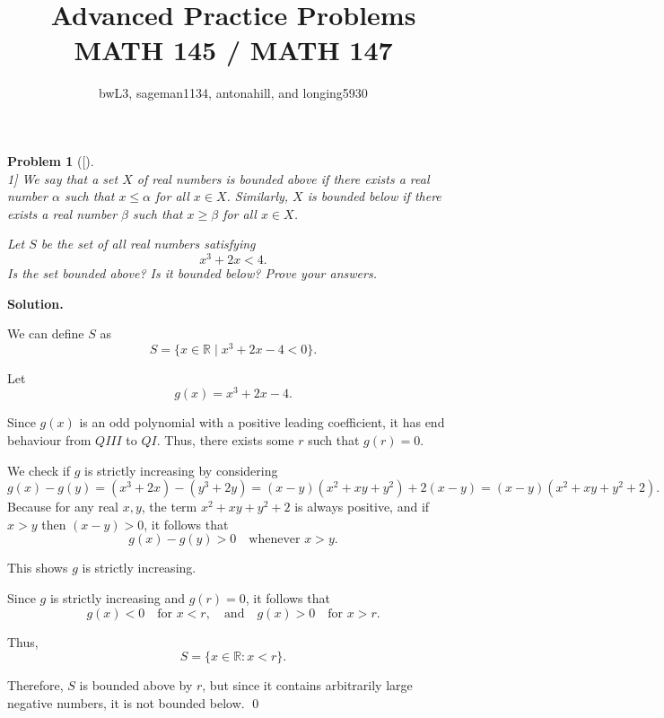 \documentclass[12pt]{article}
\title{Advanced Practice Problems \\ \large MATH 145 / MATH 147}
\author{bwL3, sageman1134, antonahill, and longing5930}
\date{}
\newtheorem{problemx}{Problem}
\newenvironment{problem}[1]{%
	\begin{problemx}[#1]\leavevmode\\[0.5em] %
	}{%
	\end{problemx}
}
\newenvironment{solution}{%
	\par\medskip
	\noindent\textbf{Solution.}\par\nopagebreak
}{%
	\hfill \qed \par\medskip
}
\begin{document}
	
	\maketitle
	
	\begin{problem}[1]
		We say that a set $X$ of real numbers is \emph{bounded above} if there exists a real number $\alpha$ such that $x \leq \alpha$ for all $x \in X$. Similarly, $X$ is \emph{bounded below} if there exists a real number $\beta$ such that $x \geq \beta$ for all $x \in X$.
		
		\vspace{1em}
		
		Let $S$ be the set of all real numbers satisfying
		\[
		x^3 + 2x < 4.
		\]
		Is the set bounded above? Is it bounded below? Prove your answers.
	\end{problem}
	
	\begin{solution}
		We can define $S$ as
		\[
		S = \{ x \in \mathbb{R} \mid x^3 + 2x - 4 < 0 \}.
		\]
		
		Let 
		\[
		g(x) = x^3 + 2x - 4.
		\]
		
		Since $g(x)$ is an odd polynomial with a positive leading coefficient, it has end behaviour from $QIII$ to $QI$. Thus, there exists some $r$ such that $g(r) = 0$.
		
		We check if $g$ is strictly increasing by considering
		\[
		g(x) - g(y) = (x^3 + 2x) - (y^3 + 2y) = (x - y)(x^2 + xy + y^2) + 2(x - y) = (x - y)(x^2 + xy + y^2 + 2).
		\]
		Because for any real $x, y$, the term $x^2 + xy + y^2 + 2$ is always positive, and if $x > y$ then $(x - y) > 0$, it follows that
		\[
		g(x) - g(y) > 0 \quad \text{whenever } x > y.
		\]
		
		This shows $g$ is strictly increasing.
		
		Since $g$ is strictly increasing and $g(r) = 0$, it follows that
		\[
		g(x) < 0 \quad \text{for } x < r, \quad \text{and} \quad g(x) > 0 \quad \text{for } x > r.
		\]
		
		Thus,
		\[
		S = \{ x \in \mathbb{R} : x < r \}.
		\]
		
		Therefore, $S$ is bounded above by $r$, but since it contains arbitrarily large negative numbers, it is not bounded below.
	\end{solution}
	
\end{document}
